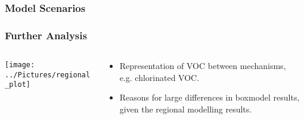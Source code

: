 \begin{frame}
    \frametitle{Model Scenarios}
    \vspace{-0.5cm}
    
\end{frame}

{
    \begin{frame}[plain]
    \end{frame}
}

{
    \begin{frame}[plain]
    \end{frame}
}

{
    \begin{frame}[plain]
    \end{frame}
}

{
    \begin{frame}[plain]
    \end{frame}
}

\begin{frame}
    \frametitle{Further Analysis} 
    \begin{columns}[onlytextwidth]
        \begin{column}{0.5\textwidth}
            \begin{flushleft}
                \vspace{-13mm}
                \texttt{[image: ../Pictures/regional\_plot]}
            \end{flushleft}
        \end{column}%
        \begin{column}{0.5\textwidth}
            \vspace{-6mm}
            \begin{itemize}
                \item Representation of VOC between mechanisms, \\ e.g. chlorinated VOC. \vspace{5mm}
                \item Reasons for large differences in boxmodel results, given the regional modelling results.
            \end{itemize}
        \end{column}
    \end{columns}
\end{frame}
